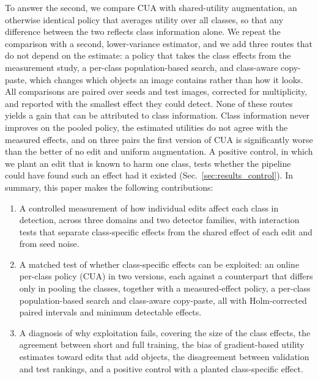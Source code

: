 \documentclass[conference]{IEEEtran}
\begin{document}
To answer the second, we compare CUA with shared-utility augmentation, an otherwise identical policy that averages utility over all classes, so that any difference between the two reflects class information alone. We repeat the comparison with a second, lower-variance estimator, and we add three routes that do not depend on the estimate: a policy that takes the class effects from the measurement study, a per-class population-based search, and class-aware copy-paste, which changes which objects an image contains rather than how it looks. All comparisons are paired over seeds and test images, corrected for multiplicity, and reported with the smallest effect they could detect. None of these routes yields a gain that can be attributed to class information. Class information never improves on the pooled policy, the estimated utilities do not agree with the measured effects, and on three pairs the first version of CUA is significantly worse than the better of no edit and uniform augmentation. A positive control, in which we plant an edit that is known to harm one class, tests whether the pipeline could have found such an effect had it existed (Sec.~\ref{sec:results_control}). In summary, this paper makes the following contributions:

\begin{enumerate}
    \item A controlled measurement of how individual edits affect each class in detection, across three domains and two detector families, with interaction tests that separate class-specific effects from the shared effect of each edit and from seed noise.
    \item A matched test of whether class-specific effects can be exploited: an online per-class policy (CUA) in two versions, each against a counterpart that differs only in pooling the classes, together with a measured-effect policy, a per-class population-based search and class-aware copy-paste, all with Holm-corrected paired intervals and minimum detectable effects.
    \item A diagnosis of why exploitation fails, covering the size of the class effects, the agreement between short and full training, the bias of gradient-based utility estimates toward edits that add objects, the disagreement between validation and test rankings, and a positive control with a planted class-specific effect.
\end{enumerate}
\end{document}
